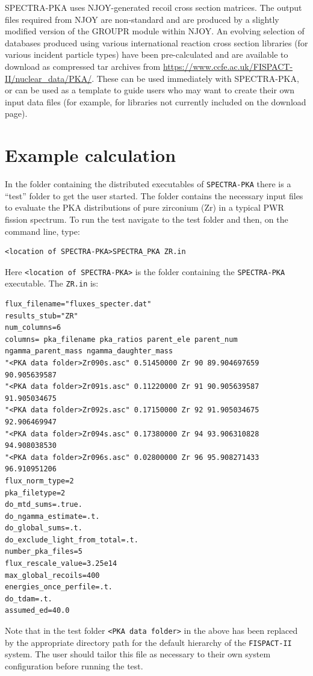 \documentclass[a4paper]{article}
\begin{document}
SPECTRA-PKA uses NJOY-generated recoil cross section matrices. The output files required from NJOY are non-standard and are produced by a slightly modified version of the GROUPR module within NJOY. An evolving selection of databases produced using various international reaction cross section libraries (for various incident particle types) have been pre-calculated and are available to download as compressed tar archives from \url{https://www.ccfe.ac.uk/FISPACT-II/nuclear_data/PKA/}. These can be used immediately with SPECTRA-PKA, or can be used as a template to guide users who may want to create their own input data files (for example, for libraries not currently included on the download page).



\section{Example calculation}
In the folder containing the distributed executables of \texttt{SPECTRA-PKA} there is a ``test'' folder to get the user started. The folder contains the necessary input files to evaluate the PKA distributions of pure zirconium (Zr) in a typical PWR fission spectrum. To run the test navigate to the test folder and then, on the command line, type:
\begin{verbatim}
<location of SPECTRA-PKA>SPECTRA_PKA ZR.in
\end{verbatim}
Here \texttt{<location of SPECTRA-PKA>} is the folder containing the \texttt{SPECTRA-PKA} executable. The \texttt{ZR.in} is:
{\footnotesize
\begin{verbatim}
flux_filename="fluxes_specter.dat"
results_stub="ZR"
num_columns=6
columns= pka_filename pka_ratios parent_ele parent_num ngamma_parent_mass ngamma_daughter_mass
"<PKA data folder>Zr090s.asc" 0.51450000 Zr 90 89.904697659 90.905639587
"<PKA data folder>Zr091s.asc" 0.11220000 Zr 91 90.905639587 91.905034675
"<PKA data folder>Zr092s.asc" 0.17150000 Zr 92 91.905034675 92.906469947
"<PKA data folder>Zr094s.asc" 0.17380000 Zr 94 93.906310828 94.908038530
"<PKA data folder>Zr096s.asc" 0.02800000 Zr 96 95.908271433 96.910951206
flux_norm_type=2
pka_filetype=2
do_mtd_sums=.true.
do_ngamma_estimate=.t.
do_global_sums=.t.
do_exclude_light_from_total=.t.
number_pka_files=5
flux_rescale_value=3.25e14
max_global_recoils=400
energies_once_perfile=.t.
do_tdam=.t.
assumed_ed=40.0
\end{verbatim}}
Note that in the test folder \texttt{<PKA data folder>} in the above has been replaced by the appropriate directory path for the default hierarchy of the \texttt{FISPACT-II} system. The user should tailor this file as necessary to their own system configuration before running the test.
\end{document}
